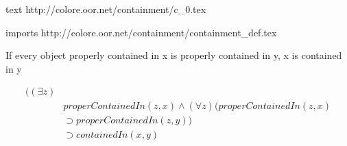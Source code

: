 text http://colore.oor.net/containment/c_0.tex

imports http://colore.oor.net/containment/containment_def.tex

If every object properly contained in x is properly contained in y, x is contained in y

\begin{align*}
((\exists z)\\
& properContainedIn(z,x) \wedge (\forall z) (properContainedIn(z,x)\\
&\supset properContainedIn(z,y))\\
&\supset containedIn(x,y)
\end{align*}
